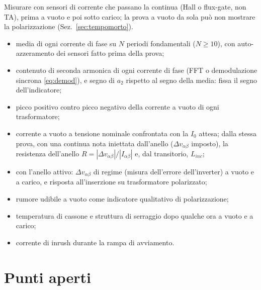 \documentclass[10pt,a4paper]{scrartcl}
\newcommand{\Linc}{L_{inc}}
\newcommand{\Izero}{I_0}
\newcommand{\ab}{\alpha\beta}
\newcommand{\Iab}{I_{\ab}}
\newcommand{\dvab}{\Delta v_{\ab}}
\begin{document}
\begin{onehalfspace}
Misurare con sensori di corrente che passano la continua (Hall o flux-gate, non TA), prima a vuoto e poi sotto carico; la prova a vuoto da sola può non mostrare la polarizzazione (Sez.~\ref{sec:tempomorto}).
\begin{itemize}[label=$\square$]
\item media di ogni corrente di fase su $N$ periodi fondamentali ($N \ge 10$), con auto-azzeramento dei sensori fatto prima della prova;
\item contenuto di seconda armonica di ogni corrente di fase (FFT o demodulazione sincrona \eqref{eq:demod}), e segno di $a_2$ rispetto al segno della media: fissa il segno dell'indicatore;
\item picco positivo contro picco negativo della corrente a vuoto di ogni trasformatore;
\item corrente a vuoto a tensione nominale confrontata con la $\Izero$ attesa; dalla stessa prova, con una continua nota iniettata dall'anello ($\dvab$ imposto), la resistenza dell'anello $R = |\dvab|/|\Iab|$ e, dal transitorio, $\Linc$;
\item con l'anello attivo: $\dvab$ di regime (misura dell'errore dell'inverter) a vuoto e a carico, e risposta all'inserzione su trasformatore polarizzato;
\item rumore udibile a vuoto come indicatore qualitativo di polarizzazione;
\item temperatura di cassone e struttura di serraggio dopo qualche ora a vuoto e a carico;
\item corrente di inrush durante la rampa di avviamento.
\end{itemize}

\section{Punti aperti}
\label{sec:aperti}


\end{onehalfspace}
\end{document}
